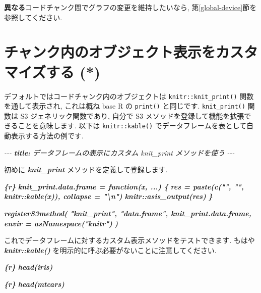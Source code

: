 \documentclass[
  11pt,
  lualatex,ja=standard,jafont=noto]{bxjsreport}
\newenvironment{Shaded}{\begin{snugshade}}{\end{snugshade}}
\newcommand{\AnnotationTok}[1]{\textcolor[rgb]{0.56,0.35,0.01}{\textbf{\textit{#1}}}}
\newcommand{\CommentTok}[1]{\textcolor[rgb]{0.56,0.35,0.01}{\textit{#1}}}
\newcommand{\InformationTok}[1]{\textcolor[rgb]{0.56,0.35,0.01}{\textbf{\textit{#1}}}}
\newcommand{\NormalTok}[1]{#1}
\begin{document}
\textbf{異なる}コードチャンク間でグラフの変更を維持したいなら, 第\ref{global-device}節を参照してください.

\hypertarget{opts-render}{%
\section{チャンク内のオブジェクト表示をカスタマイズする (*)}\label{opts-render}}

デフォルトではコードチャンク内のオブジェクトは \texttt{knitr::knit\_print()} 関数を通して表示され, これは概ね base R の \texttt{print()} と同じです. \texttt{knit\_print()} 関数は S3 ジェネリック関数であり, 自分で S3 メソッドを登録して機能を拡張できることを意味します. 以下は \texttt{knitr::kable()} でデータフレームを表として自動表示する方法の例です.

\begin{Shaded}
\begin{Highlighting}[]
\CommentTok{{-}{-}{-}}
\AnnotationTok{title:}\CommentTok{ データフレームの表示にカスタム \textasciigrave{}knit\_print\textasciigrave{} メソッドを使う}
\CommentTok{{-}{-}{-}}

\NormalTok{初めに }\InformationTok{\textasciigrave{}knit\_print\textasciigrave{}}\NormalTok{ メソッドを定義して登録します.}

\InformationTok{\textasciigrave{}\textasciigrave{}\textasciigrave{}\{r\}}
\InformationTok{knit\_print.data.frame = function(x, ...) \{}
\InformationTok{  res = paste(c("", "", knitr::kable(x)), collapse = "\textbackslash{}n")}
\InformationTok{  knitr::asis\_output(res)}
\InformationTok{\}}

\InformationTok{registerS3method(}
\InformationTok{  "knit\_print", "data.frame", knit\_print.data.frame,}
\InformationTok{  envir = asNamespace("knitr")}
\InformationTok{)}
\InformationTok{\textasciigrave{}\textasciigrave{}\textasciigrave{}}

\NormalTok{これでデータフレームに対するカスタム表示メソッドをテストできます. もはや }\InformationTok{\textasciigrave{}knitr::kable()\textasciigrave{}}\NormalTok{ を明示的に呼ぶ必要がないことに注意してください.}

\InformationTok{\textasciigrave{}\textasciigrave{}\textasciigrave{}\{r\}}
\InformationTok{head(iris)}
\InformationTok{\textasciigrave{}\textasciigrave{}\textasciigrave{}}

\InformationTok{\textasciigrave{}\textasciigrave{}\textasciigrave{}\{r\}}
\InformationTok{head(mtcars)}
\InformationTok{\textasciigrave{}\textasciigrave{}\textasciigrave{}}
\end{Highlighting}
\end{Shaded}
\end{document}
